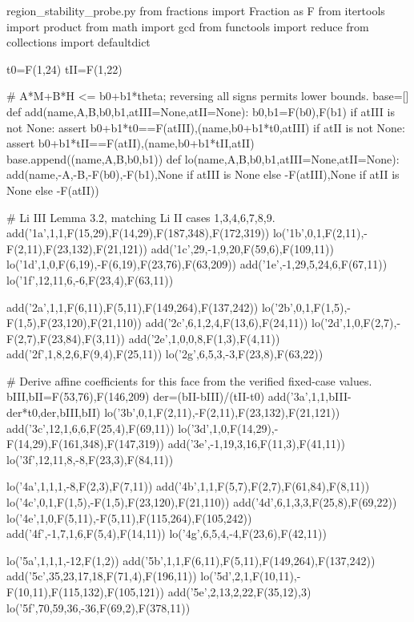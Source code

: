 \begin{filecontents*}[overwrite]{region_stability_probe.py}
from fractions import Fraction as F
from itertools import product
from math import gcd
from functools import reduce
from collections import defaultdict

t0=F(1,24)
tII=F(1,22)

# A*M+B*H <= b0+b1*theta; reversing all signs permits lower bounds.
base=[]
def add(name,A,B,b0,b1,atIII=None,atII=None):
    b0,b1=F(b0),F(b1)
    if atIII is not None:
        assert b0+b1*t0==F(atIII),(name,b0+b1*t0,atIII)
    if atII is not None:
        assert b0+b1*tII==F(atII),(name,b0+b1*tII,atII)
    base.append((name,A,B,b0,b1))
def lo(name,A,B,b0,b1,atIII=None,atII=None):
    add(name,-A,-B,-F(b0),-F(b1),None if atIII is None else -F(atIII),None if atII is None else -F(atII))

# Li III Lemma 3.2, matching Li II cases 1,3,4,6,7,8,9.
add('1a',1,1,F(15,29),F(14,29),F(187,348),F(172,319))
lo('1b',0,1,F(2,11),-F(2,11),F(23,132),F(21,121))
add('1c',29,-1,9,20,F(59,6),F(109,11))
lo('1d',1,0,F(6,19),-F(6,19),F(23,76),F(63,209))
add('1e',-1,29,5,24,6,F(67,11))
lo('1f',12,11,6,-6,F(23,4),F(63,11))

add('2a',1,1,F(6,11),F(5,11),F(149,264),F(137,242))
lo('2b',0,1,F(1,5),-F(1,5),F(23,120),F(21,110))
add('2c',6,1,2,4,F(13,6),F(24,11))
lo('2d',1,0,F(2,7),-F(2,7),F(23,84),F(3,11))
add('2e',1,0,0,8,F(1,3),F(4,11))
add('2f',1,8,2,6,F(9,4),F(25,11))
lo('2g',6,5,3,-3,F(23,8),F(63,22))

# Derive affine coefficients for this face from the verified fixed-case values.
bIII,bII=F(53,76),F(146,209)
der=(bII-bIII)/(tII-t0)
add('3a',1,1,bIII-der*t0,der,bIII,bII)
lo('3b',0,1,F(2,11),-F(2,11),F(23,132),F(21,121))
add('3c',12,1,6,6,F(25,4),F(69,11))
lo('3d',1,0,F(14,29),-F(14,29),F(161,348),F(147,319))
add('3e',-1,19,3,16,F(11,3),F(41,11))
lo('3f',12,11,8,-8,F(23,3),F(84,11))

lo('4a',1,1,1,-8,F(2,3),F(7,11))
add('4b',1,1,F(5,7),F(2,7),F(61,84),F(8,11))
lo('4c',0,1,F(1,5),-F(1,5),F(23,120),F(21,110))
add('4d',6,1,3,3,F(25,8),F(69,22))
lo('4e',1,0,F(5,11),-F(5,11),F(115,264),F(105,242))
add('4f',-1,7,1,6,F(5,4),F(14,11))
lo('4g',6,5,4,-4,F(23,6),F(42,11))

lo('5a',1,1,1,-12,F(1,2))
add('5b',1,1,F(6,11),F(5,11),F(149,264),F(137,242))
add('5c',35,23,17,18,F(71,4),F(196,11))
lo('5d',2,1,F(10,11),-F(10,11),F(115,132),F(105,121))
add('5e',2,13,2,22,F(35,12),3)
lo('5f',70,59,36,-36,F(69,2),F(378,11))


\end{filecontents*}
